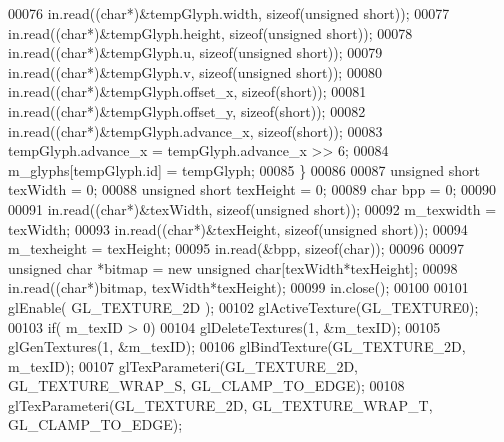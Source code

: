 \begin{DoxyCode}
00076         in.read((\textcolor{keywordtype}{char}*)&tempGlyph.width, \textcolor{keyword}{sizeof}(\textcolor{keywordtype}{unsigned} \textcolor{keywordtype}{short}));
00077         in.read((\textcolor{keywordtype}{char}*)&tempGlyph.height, \textcolor{keyword}{sizeof}(\textcolor{keywordtype}{unsigned} \textcolor{keywordtype}{short}));
00078         in.read((\textcolor{keywordtype}{char}*)&tempGlyph.u, \textcolor{keyword}{sizeof}(\textcolor{keywordtype}{unsigned} \textcolor{keywordtype}{short}));
00079         in.read((\textcolor{keywordtype}{char}*)&tempGlyph.v, \textcolor{keyword}{sizeof}(\textcolor{keywordtype}{unsigned} \textcolor{keywordtype}{short}));
00080         in.read((\textcolor{keywordtype}{char}*)&tempGlyph.offset_x, \textcolor{keyword}{sizeof}(\textcolor{keywordtype}{short}));
00081         in.read((\textcolor{keywordtype}{char}*)&tempGlyph.offset_y, \textcolor{keyword}{sizeof}(\textcolor{keywordtype}{short}));
00082         in.read((\textcolor{keywordtype}{char}*)&tempGlyph.advance_x, \textcolor{keyword}{sizeof}(\textcolor{keywordtype}{short}));
00083         tempGlyph.advance_x = tempGlyph.advance_x >> 6;
00084         m_glyphs[tempGlyph.id] = tempGlyph;
00085     \}
00086 
00087     \textcolor{keywordtype}{unsigned} \textcolor{keywordtype}{short} texWidth = 0;
00088     \textcolor{keywordtype}{unsigned} \textcolor{keywordtype}{short} texHeight = 0;
00089     \textcolor{keywordtype}{char} bpp = 0;
00090 
00091     in.read((\textcolor{keywordtype}{char}*)&texWidth, \textcolor{keyword}{sizeof}(\textcolor{keywordtype}{unsigned} \textcolor{keywordtype}{short}));
00092     m_texwidth = texWidth;
00093     in.read((\textcolor{keywordtype}{char}*)&texHeight, \textcolor{keyword}{sizeof}(\textcolor{keywordtype}{unsigned} \textcolor{keywordtype}{short}));
00094     m_texheight = texHeight;
00095     in.read(&bpp, \textcolor{keyword}{sizeof}(\textcolor{keywordtype}{char}));
00096 
00097     \textcolor{keywordtype}{unsigned} \textcolor{keywordtype}{char} *bitmap = \textcolor{keyword}{new} \textcolor{keywordtype}{unsigned} \textcolor{keywordtype}{char}[texWidth*texHeight];
00098     in.read((\textcolor{keywordtype}{char}*)bitmap, texWidth*texHeight);
00099     in.close();
00100 
00101     glEnable( GL_TEXTURE_2D );
00102     glActiveTexture(GL_TEXTURE0);
00103     \textcolor{keywordflow}{if}( m_texID > 0)
00104         glDeleteTextures(1, &m_texID);
00105     glGenTextures(1, &m_texID);
00106     glBindTexture(GL_TEXTURE_2D, m_texID);
00107     glTexParameteri(GL_TEXTURE_2D, GL_TEXTURE_WRAP_S, GL_CLAMP_TO_EDGE);
00108     glTexParameteri(GL_TEXTURE_2D, GL_TEXTURE_WRAP_T, GL_CLAMP_TO_EDGE);

\end{DoxyCode}
